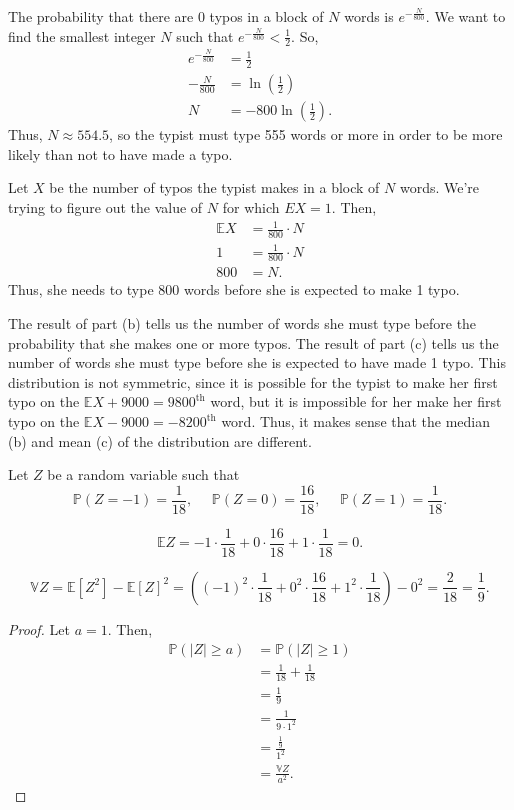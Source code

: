 \documentclass[12pt]{article}
\begin{document}
\medskip
{} The probability that there are 0 typos in a block of $N$ words is $e^{-\frac{N}{800}}$. We want to find the smallest integer $N$ such that $e^{-\frac{N}{800}} < \frac12$. So,
    \begin{align*}
        e^{-\frac{N}{800}} &= \frac12 \\
        -\frac{N}{800} &= \ln(\frac12) \\
        N &= -800\ln(\frac12).
    \end{align*}
    Thus, $N \approx 554.5$, so the typist must type 555 words or more in order to be more likely than not to have made a typo.
    
\medskip
{} Let $X$ be the number of typos the typist makes in a block of $N$ words. We're trying to figure out the value of $N$ for which $EX = 1$. Then,
    \begin{align*}
        \mathbb EX &= \frac1{800} \cdot N \\
        1 &= \frac1{800} \cdot N \\
        800 &= N.
    \end{align*}
    Thus, she needs to type 800 words before she is expected to make 1 typo.
    
\medskip
{} The result of part (b) tells us the number of words she must type before the probability that she makes one or more typos. The result of part (c) tells us the number of words she must type before she is expected to have made 1 typo. This distribution is not symmetric, since it is possible for the typist to make her first typo on the $\mathbb EX + 9000 = 9800^\text{th}$ word, but it is impossible for her make her first typo on the $\mathbb EX - 9000 = -8200^\text{th}$ word. Thus, it makes sense that the median (b) and mean (c) of the distribution are different.
    
\newpage
{} Let $Z$ be a random variable such that $$\mathbb P(Z=-1) = \frac1{18},~~~~~~\mathbb P(Z=0)=\frac{16}{18},~~~~~~\mathbb P(Z=1)=\frac{1}{18}.$$

    $$\mathbb EZ = -1 \cdot \frac1{18} + 0 \cdot \frac{16}{18} + 1 \cdot \frac1{18} = 0.$$
    
    $$\mathbb VZ = \mathbb E[Z^2] - \mathbb E[Z]^2 = ((-1)^2 \cdot \frac1{18} + 0^2 \cdot \frac{16}{18} + 1^2 \cdot \frac1{18}) - 0^2 = \frac2{18} = \frac19.$$
    
\begin{proof}
    Let $a = 1$. Then,
    \begin{align*}
        \mathbb P(|Z| \geq a) &= \mathbb P(|Z| \geq 1) \\
                            &= \frac1{18} + \frac1{18} \\
                            &= \frac19 \\
                            &= \frac1{9 \cdot 1^2} \\
                            &= \frac{\frac19}{1^2} \\
                            &= \frac{\mathbb VZ}{a^2}.
    \end{align*}
\end{proof}
    
\end{document}
